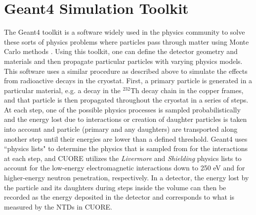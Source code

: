 \section{Geant4 Simulation Toolkit}
The Geant4 toolkit is a software widely used in the physics community to solve these sorts of physics problems where particles pass through matter using Monte Carlo methods \cite{AGOSTINELLI2003250, 528223, ALLISON2016186}.
Using this toolkit, one can define the detector geometry and materials and then propagate particular particles with varying physics models.
This software uses a similar procedure as described above to simulate the effects from radioactive decays in the cryostat.
First, a primary particle is generated in a particular material, e.g. a decay in the $^{232}$Th decay chain in the copper frames, and that particle is then propagated throughout the cryostat in a series of steps.
At each step, one of the possible physics processes is sampled probabilistically and the energy lost due to interactions or creation of daughter particles is taken into account and particle (primary and any daughters) are transported along another step until their energies are lower than a defined threshold.
Geant4 uses ``physics lists" to determine the physics that is sampled from for the interactions at each step, and CUORE utilizes the \textit{Livermore} and \textit{Shielding} physics lists to account for the low-energy electromagnetic interactions down to 250 eV and for higher-energy neutron penetration, respectively.
In a detector, the energy lost by the particle and its daughters during steps inside the volume can then be recorded as the energy deposited in the detector and corresponds to what is measured by the NTDs in CUORE.

